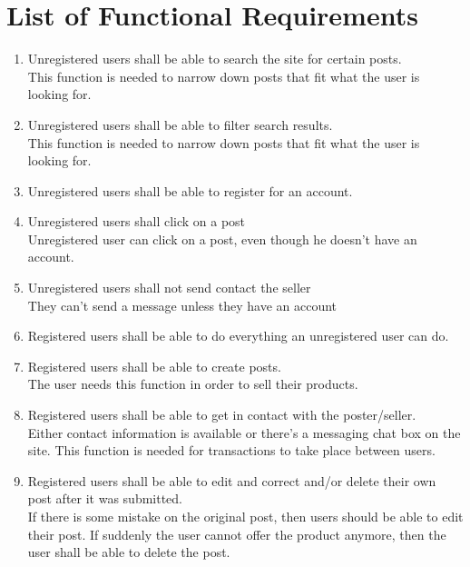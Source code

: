 \section{List of Functional Requirements}

\begin{description}[font=\itshape]
\item[Unregistered User]\hfill
    \begin{enumerate}
        \item Unregistered users shall be able to search the site for certain posts.\\This function is needed to narrow down posts that fit what the user is looking for.
        \item Unregistered users shall be able to filter search results.\\This function is needed to narrow down posts that fit what the user is looking for.
        \item Unregistered users shall be able to register for an account.
        \item Unregistered users shall click on a post\\Unregistered user can click on a post, even though he doesn’t have an account.
        \item Unregistered users shall not send contact the seller\\They can’t send a message unless they have an account 
    \end{enumerate}
\item[Registered User]\hfill
    \begin{enumerate}
    	\setcounter{enumi}{5}
        \item Registered users shall be able to do everything an unregistered user can do.
        \item Registered users shall be able to create posts.\\The user needs this function in order to sell their products.
        \item Registered users shall be able to get in contact with the poster/seller.\\Either contact information is available or there’s a messaging chat box on the site. This function is needed for transactions to take place between users. 
		\item Registered users shall be able to edit and correct and/or delete their own post after it was submitted.\\If there is some mistake on the original post, then users should be able to edit their post. If suddenly the user cannot offer the product anymore, then the user shall be able to delete the post.

\end{enumerate}
\end{description}
